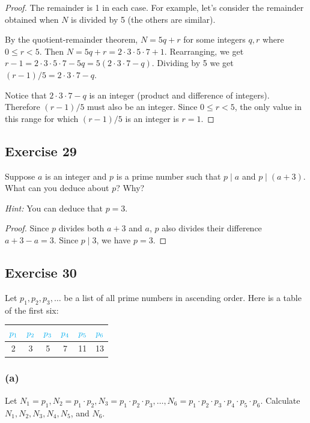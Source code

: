 \documentclass[14pt]{extarticle}
\newcommand{\cy}{\color{cyan}}
\begin{document}
\begin{proof}
The remainder is 1 in each case. For example, let's consider the remainder obtained when $N$ is divided by 5 (the others are similar). 

By the quotient-remainder theorem, $N = 5q+r$ for some integers $q,r$ where $0 \leq r < 5$. Then $N = 5q+r = 2\cdot3\cdot5\cdot7 + 1$. Rearranging, we get $r - 1 = 2\cdot3\cdot5\cdot7 - 5q = 5(2\cdot3\cdot7 - q)$. Dividing by 5 we get $(r-1)/5 = 2\cdot3\cdot7 - q$. 

Notice that $2\cdot3\cdot7 - q$ is an integer (product and difference of integers). Therefore $(r-1)/5$ must also be an integer. Since $0 \leq r < 5$, the only value in this range for which $(r-1)/5$ is an integer is $r = 1$.
\end{proof}

\subsection{Exercise 29}
Suppose $a$ is an integer and $p$ is a prime number such that $p \mid a$ and $p \mid (a + 3)$. What can you deduce
about $p$? Why?

{\it Hint:} You can deduce that $p = 3$.

\begin{proof}
Since $p$ divides both $a+3$ and $a$, $p$ also divides their difference $a+3 - a = 3$. Since $p \mid 3$, we have $p = 3$.
\end{proof}

\subsection{Exercise 30}
Let $p_1, p_2, p_3, \ldots$ be a list of all prime numbers in ascending order. Here is a table of the first six:

\begin{center}
\begin{tabular}{|c|c|c|c|c|c|}
\hline
$\cy p_1$ & $\cy p_2$ & $\cy p_3$ & $\cy p_4$ & $\cy p_5$ & $\cy p_6$\\
\hline
2 & 3 & 5 & 7 & 11 & 13 \\
\hline
\end{tabular}
\end{center}

\subsubsection{(a)}
Let $N_1 = p_1, N_2 = p_1 \cdot p_2, N_3 = p_1 \cdot p_2 \cdot p_3, \ldots, N_6 = p_1 \cdot p_2 \cdot p_3 \cdot p_4 \cdot p_5 \cdot p_6$. Calculate $N_1, N_2, N_3, N_4, N_5$, and $N_6$.
\end{document}
